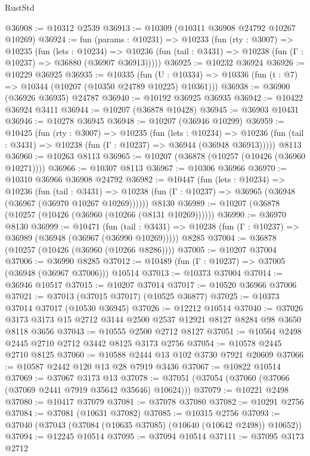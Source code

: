 \begin{lexlean}{RustStd}
\begin{coremodule}
@36908 := @10312 @2539
@36913 := @10309 (@10311 @36908 @24792 @10267 @10269)
@36924 := fun (params : @10231) =>
  @10233
    (fun (rty : @3007) =>
    @10235
      (fun (lets : @10234) =>
      @10236 (fun (tail : @3431) => @10238 (fun (Γ : @10237) => @36880 (@36907 @36913)))))
@36925 := @10232 @36924
@36926 := @10229 @36925
@36935 := @10335
    (fun (U : @10334) => @10336 (fun (t : @7) => @10344 (@10207 (@10350 @24789 @10225) @10361)))
@36938 := @36900 (@36926 @36935) @24787
@36940 := @10192 @36925 @36935
@36942 := @10422 @36924 @3411
@36944 := @10207 (@36878 @10428)
@36945 := @36903 @10431
@36946 := @10278 @36945
@36948 := @10207 (@36946 @10299)
@36959 := @10425
    (fun (rty : @3007) =>
    @10235
      (fun (lets : @10234) =>
      @10236 (fun (tail : @3431) => @10238 (fun (Γ : @10237) => @36944 (@36948 @36913)))))
    @8113
@36960 := @10263 @8113
@36965 := @10207 (@36878 (@10257 (@10426 (@36960 @10271))))
@36966 := @10307 @8113
@36967 := @10306 @36966
@36970 := @10310 @36966 @36908 @24792
@36982 := @10447
    (fun (lets : @10234) =>
    @10236
      (fun (tail : @3431) =>
      @10238 (fun (Γ : @10237) => @36965 (@36948 (@36967 (@36970 @10267 @10269))))))
    @8130
@36989 := @10207 (@36878 (@10257 (@10426 (@36960 (@10266 (@8131 @10269))))))
@36990 := @36970 @8130
@36999 := @10471
    (fun (tail : @3431) => @10238 (fun (Γ : @10237) => @36989 (@36948 (@36967 (@36990 @10269)))))
    @8285
@37004 := @36878 (@10257 (@10426 (@36960 (@10266 @8286))))
@37005 := @10207 @37004
@37006 := @36990 @8285
@37012 := @10489 (fun (Γ : @10237) => @37005 (@36948 (@36967 @37006))) @10514
@37013 := @10373 @37004
@37014 := @36946 @10517
@37015 := @10207 @37014
@37017 := @10520 @36966 @37006
@37021 := @37013 (@37015 @37017) (@10525 @36877)
@37025 := @10373 @37014 @37017 (@10530 @36945)
@37026 := @12212 @10514
@37040 := @37026 @3173 @3173 @15 @2712 @3144 @2500 @2537 @12921 @8127 @8284 @98 @3650 @8118 @3656
@37043 := @10555 @2500 @2712 @8127
@37051 := @10564 @2498 @2445 @2710 @2712 @3442 @8125 @3173 @2756
@37054 := @10578 @2445 @2710 @8125
@37060 := @10588 @2444 @13 @102 @3730 @7921 @20609
@37066 := @10587 @2442 @120 @13 @28 @7919 @3436
@37067 := @10822 @10514
@37069 := @37067 @3173 @13
@37078 := @37051 (@37054 (@37060 (@37066 (@37069 @2441 @7919 @35642 @35646) @10624)))
@37079 := @10221 @2498
@37080 := @10417 @37079
@37081 := @37078 @37080
@37082 := @10291 @2756
@37084 := @37081 (@10631 @37082)
@37085 := @10315 @2756
@37093 := @37040 (@37043 (@37084 (@10635 @37085) (@10640 (@10642 @2498)) @10652))
@37094 := @12245 @10514
@37095 := @37094 @10514
@37111 := @37095
    @3173
    @2712

\end{coremodule}
\end{lexlean}
